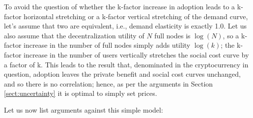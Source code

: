 \documentclass[12pt, final]{article}
\begin{document}
To avoid the question of whether the k-factor increase in adoption leads to a k-factor horizontal stretching or a k-factor vertical stretching of the demand curve, let's assume  that two are equivalent, i.e., demand elasticity is exactly 1.0.  Let us also assume that the decentralization utility  of $N$ full nodes is $\log(N)$, so a k-factor increase in the number of full nodes simply adds utility $\log(k)$; the k-factor increase in the number of users vertically stretches the social cost curve by a factor of k. This leads to the result that, denominated in the cryptocurrency in question, adoption leaves the private benefit and social cost curves unchanged, and so there is no correlation; hence, as per the arguments in Section \ref{sect:uncertainty} it is optimal to simply set prices. 

Let us now list arguments against this simple model:
\end{document}
